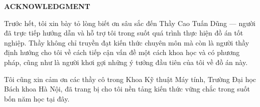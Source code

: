 \documentclass[../main.tex]{subfiles}
\begin{document}
\begin{center}
    \Large{\textbf{ACKNOWLEDGMENT}}\\
\end{center}
\vspace{1cm}

Trước hết, tôi xin bày tỏ lòng biết ơn sâu sắc đến Thầy Cao Tuấn Dũng — người đã trực tiếp hướng dẫn và hỗ trợ tôi trong suốt quá trình thực hiện đồ án tốt nghiệp. Thầy không chỉ truyền đạt kiến thức chuyên môn mà còn là người thầy định hướng cho tôi về cách tiếp cận vấn đề một cách khoa học và có phương pháp, cũng như là người khơi gợi những ý tưởng đầu tiên của tôi về đồ án này.

Tôi cũng xin cảm ơn các thầy cô trong Khoa Kỹ thuật Máy tính, Trường Đại học Bách khoa Hà Nội, đã trang bị cho tôi nền tảng kiến thức vững chắc trong suốt bốn năm học tại đây.

\end{document}
